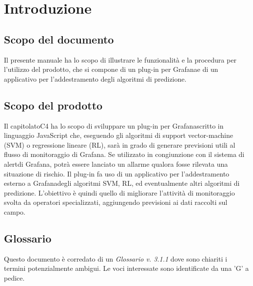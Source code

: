 \section{Introduzione}
	\subsection{Scopo del documento}
		Il presente manuale ha lo scopo di illustrare le funzionalità e la procedura per l'utilizzo del prodotto\glo, che si compone di un plug-in per Grafana\glosp e di un applicativo per l'addestramento degli algoritmi di predizione.
	\subsection{Scopo del prodotto}
		Il capitolato\glosp C4 ha lo scopo di sviluppare un plug-in per Grafana\glosp scritto in linguaggio JavaScript che, eseguendo gli algoritmi di support vector-machine (SVM\glo) o regressione lineare (RL\glo), sarà in grado di generare previsioni utili al flusso di monitoraggio di Grafana\glo. Se utilizzato in congiunzione con il sistema di alert\glosp di Grafana\glo, potrà essere lanciato un allarme qualora fosse rilevata una situazione di rischio.
		Il plug-in fa uso di un applicativo per l'addestramento esterno a Grafana\glosp degli algoritmi SVM\glosp, RL\glosp, ed eventualmente altri algoritmi di predizione. L'obiettivo è quindi quello di migliorare l'attività di monitoraggio svolta da operatori specializzati, aggiungendo previsioni ai dati raccolti sul campo.
	\subsection{Glossario}
		Questo documento è corredato di un \textit{Glossario v. 3.1.1} dove sono chiariti i termini potenzialmente ambigui. Le voci interessate sono identificate da una 'G' a pedice.
